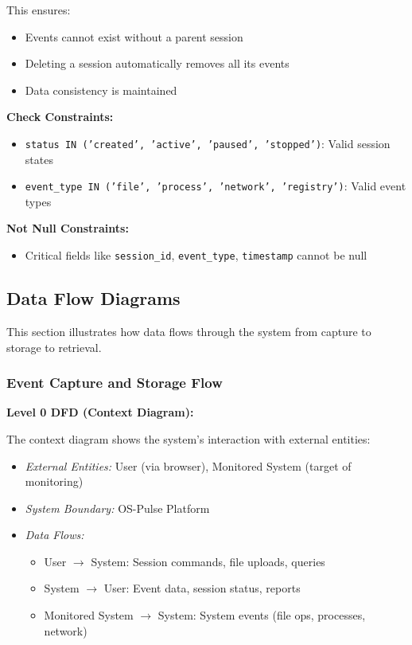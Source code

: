 This ensures:
\begin{itemize}
    \item Events cannot exist without a parent session
    \item Deleting a session automatically removes all its events
    \item Data consistency is maintained
\end{itemize}

\textbf{Check Constraints:}
\begin{itemize}
    \item \texttt{status IN ('created', 'active', 'paused', 'stopped')}: Valid session states
    \item \texttt{event\_type IN ('file', 'process', 'network', 'registry')}: Valid event types
\end{itemize}

\textbf{Not Null Constraints:}
\begin{itemize}
    \item Critical fields like \texttt{session\_id}, \texttt{event\_type}, \texttt{timestamp} cannot be null
\end{itemize}

\subsection{Data Flow Diagrams}

This section illustrates how data flows through the system from capture to storage to retrieval.

\subsubsection{Event Capture and Storage Flow}

\textbf{Level 0 DFD (Context Diagram):}

The context diagram shows the system's interaction with external entities:

\begin{itemize}
    \item \textit{External Entities:} User (via browser), Monitored System (target of monitoring)
    \item \textit{System Boundary:} OS-Pulse Platform
    \item \textit{Data Flows:}
    \begin{itemize}
        \item User $\rightarrow$ System: Session commands, file uploads, queries
        \item System $\rightarrow$ User: Event data, session status, reports
        \item Monitored System $\rightarrow$ System: System events (file ops, processes, network)
    \end{itemize}
\end{itemize}

